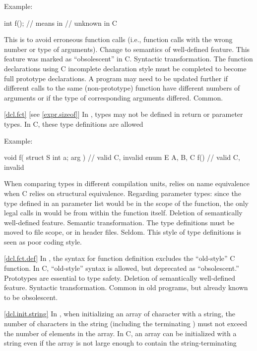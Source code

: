 Example:

\begin{codeblock}
int f();            // means    in \Cpp
                    //  unknown \tcode{)} in C
\end{codeblock}

\rationale
This is to avoid erroneous function calls (i.e., function calls
with the wrong number or type of arguments).
\effect
Change to semantics of well-defined feature.
This feature was marked as ``obsolescent'' in C.
\difficulty
Syntactic transformation.
The function declarations using C incomplete declaration style must
be completed to become full prototype declarations.
A program may need to be updated further if different calls to the
same (non-prototype) function have different numbers of arguments or
if the type of corresponding arguments differed.
\howwide
Common.

\ref{dcl.fct} [see \ref{expr.sizeof}]
\change In \Cpp, types may not be defined in return or parameter types. In C, these type definitions are allowed

Example:

\begin{codeblock}
void f( struct S { int a; } arg ) {}    // valid C, invalid \Cpp
enum E { A, B, C } f() {}               // valid C, invalid \Cpp
\end{codeblock}

\rationale
When comparing types in different compilation units, \Cpp relies
on name equivalence when C relies on structural equivalence.
Regarding parameter types: since the type defined in an parameter list
would be in the scope of the function, the only legal calls in \Cpp
would be from within the function itself.
\effect
Deletion of semantically well-defined feature.
\difficulty
Semantic transformation.
The type definitions must be moved to file scope, or in header files.
\howwide
Seldom.
This style of type definitions is seen as poor coding style.

\ref{dcl.fct.def}
\change In \Cpp, the syntax for function definition excludes the ``old-style'' C function.
In C, ``old-style'' syntax is allowed, but deprecated as ``obsolescent.''
\rationale
Prototypes are essential to type safety.
\effect
Deletion of semantically well-defined feature.
\difficulty
Syntactic transformation.
\howwide
Common in old programs, but already known to be obsolescent.

\ref{dcl.init.string}
\change In \Cpp, when initializing an array of character with a string, the number of
characters in the string (including the terminating ) must not exceed the
number of elements in the array. In C, an array can be initialized with a string even if
the array is not large enough to contain the string-terminating 

